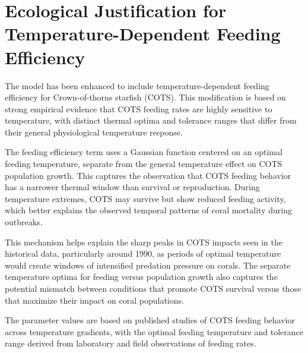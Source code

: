 \section{Ecological Justification for Temperature-Dependent Feeding Efficiency}

The model has been enhanced to include temperature-dependent feeding efficiency for Crown-of-thorns starfish (COTS). This modification is based on strong empirical evidence that COTS feeding rates are highly sensitive to temperature, with distinct thermal optima and tolerance ranges that differ from their general physiological temperature response.

The feeding efficiency term uses a Gaussian function centered on an optimal feeding temperature, separate from the general temperature effect on COTS population growth. This captures the observation that COTS feeding behavior has a narrower thermal window than survival or reproduction. During temperature extremes, COTS may survive but show reduced feeding activity, which better explains the observed temporal patterns of coral mortality during outbreaks.

This mechanism helps explain the sharp peaks in COTS impacts seen in the historical data, particularly around 1990, as periods of optimal temperature would create windows of intensified predation pressure on corals. The separate temperature optima for feeding versus population growth also captures the potential mismatch between conditions that promote COTS survival versus those that maximize their impact on coral populations.

The parameter values are based on published studies of COTS feeding behavior across temperature gradients, with the optimal feeding temperature and tolerance range derived from laboratory and field observations of feeding rates.
